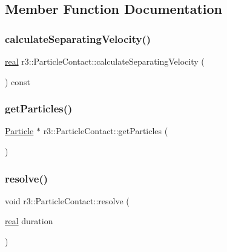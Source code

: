 \subsection{Member Function Documentation}
\mbox{\label{classr3_1_1_particle_contact_a50956285c7722f209ffa5f851502e6d9}} 
\subsubsection{\texorpdfstring{calculate\+Separating\+Velocity()}{calculateSeparatingVelocity()}}
{\footnotesize\ttfamily \mbox{\hyperlink{namespacer3_ab2016b3e3f743fb735afce242f0dc1eb}{real}} r3\+::\+Particle\+Contact\+::calculate\+Separating\+Velocity (\begin{DoxyParamCaption}{ }\end{DoxyParamCaption}) const}

\mbox{\label{classr3_1_1_particle_contact_aeeacfbf5cbed36cf2be65775066e8f14}} 
\subsubsection{\texorpdfstring{get\+Particles()}{getParticles()}}
{\footnotesize\ttfamily \mbox{\hyperlink{classr3_1_1_particle}{Particle}} $\ast$ r3\+::\+Particle\+Contact\+::get\+Particles (\begin{DoxyParamCaption}{ }\end{DoxyParamCaption})}

\mbox{\label{classr3_1_1_particle_contact_a2878440163ead45a12454b90d3d1d774}} 
\subsubsection{\texorpdfstring{resolve()}{resolve()}}
{\footnotesize\ttfamily void r3\+::\+Particle\+Contact\+::resolve (\begin{DoxyParamCaption}\item[{\mbox{\hyperlink{namespacer3_ab2016b3e3f743fb735afce242f0dc1eb}{real}}}]{duration }\end{DoxyParamCaption})}

